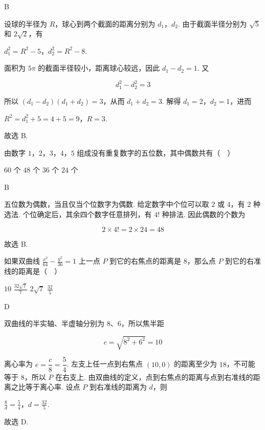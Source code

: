 \begin{answer}
B
\end{answer}

\begin{solution}
设球的半径为 \(R\)，球心到两个截面的距离分别为 \(d_1\)，\(d_2\). 由于截面半径分别为 \(\sqrt5\) 和 \(2\sqrt2\)，有

\(d_1^2=R^2-5\)，\(d_2^2=R^2-8\).

面积为 \(5\pi\) 的截面半径较小，距离球心较远，因此 \(d_1-d_2=1\). 又

\[d_1^2-d_2^2=3\]

所以 \((d_1-d_2)(d_1+d_2)=3\)，从而 \(d_1+d_2=3\). 解得 \(d_1=2\)，\(d_2=1\)，进而

\(R^2=d_1^2+5=4+5=9\)，\(R=3\).

故选 B.
\end{solution}

\begin{problem}
由数字 \(1\)，\(2\)，\(3\)，\(4\)，\(5\) 组成没有重复数字的五位数，其中偶数共有（\(\quad\)）

\choices
    {\(60\text{ 个}\)}
    {\(48\text{ 个}\)}
    {\(36\text{ 个}\)}
    {\(24\text{ 个}\)}
\end{problem}

\begin{answer}
B
\end{answer}

\begin{solution}
五位数为偶数，当且仅当个位数字为偶数. 给定数字中个位可以取 \(2\) 或 \(4\)，有 \(2\) 种选法. 个位确定后，其余四个数字任意排列，有 \(4!\) 种排法. 因此偶数的个数为

\[2\times4!=2\times24=48\]

故选 B.
\end{solution}

\begin{problem}
如果双曲线 \(\frac{x^2}{64} - \frac{y^2}{36} = 1\) 上一点 \(P\) 到它的右焦点的距离是 \(8\)，那么点 \(P\) 到它的右准线的距离是（\(\quad\)）

\choices
    {\(10\)}
    {\(\frac{32\sqrt{7}}{7}\)}
    {\(2\sqrt{7}\)}
    {\(\frac{32}{5}\)}
\end{problem}

\begin{answer}
D
\end{answer}

\begin{solution}
双曲线的半实轴、半虚轴分别为 \(8\)、\(6\)，所以焦半距

\[c=\sqrt{8^2+6^2}=10\]

离心率为 \(e=\dfrac{c}{8}=\dfrac54\). 左支上任一点到右焦点 \((10,0)\) 的距离至少为 \(18\)，不可能等于 \(8\)，所以 \(P\) 在右支上. 由双曲线的定义，点到右焦点的距离与点到右准线的距离之比等于离心率. 设点 \(P\) 到右准线的距离为 \(d\)，则

\(\frac{8}{d}=\frac54\)，\(d=\frac{32}{5}\).

故选 D.
\end{solution}

